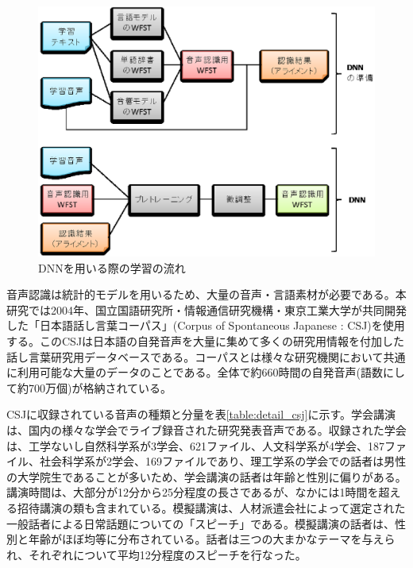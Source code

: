 \begin{figure}[H]
  \begin{center}
    \includegraphics{./figure/flow_train_dnn.eps}
  \end{center}
  \caption{DNNを用いる際の学習の流れ \label{fig:flow_train_dnn}}
\end{figure}

\vspace{0.2in}\par
音声認識は統計的モデルを用いるため、大量の音声・言語素材が必要である。本研究では2004年、国立国語研究所・情報通信研究機構・東京工業大学が共同開発した「日本語話し言葉コーパス」(Corpus of Spontaneous Japanese : CSJ)を使用する。このCSJは日本語の自発音声を大量に集めて多くの研究用情報を付加した話し言葉研究用データベースである。コーパスとは様々な研究機関において共通に利用可能な大量のデータのことである。全体で約660時間の自発音声(語数にして約700万個)が格納されている。\par
CSJに収録されている音声の種類と分量を表\ref{table:detail_csj}に示す。学会講演は、国内の様々な学会でライブ録音された研究発表音声である。収録された学会は、工学ないし自然科学系が3学会、621ファイル、人文科学系が4学会、187ファイル、社会科学系が2学会、169ファイルであり、理工学系の学会での話者は男性の大学院生であることが多いため、学会講演の話者は年齢と性別に偏りがある。講演時間は、大部分が12分から25分程度の長さであるが、なかには1時間を超える招待講演の類も含まれている。模擬講演は、人材派遣会社によって選定された一般話者による日常話題についての「スピーチ」である。模擬講演の話者は、性別と年齢がほぼ均等に分布されている。話者は三つの大まかなテーマを与えられ、それぞれについて平均12分程度のスピーチを行なった。\par

